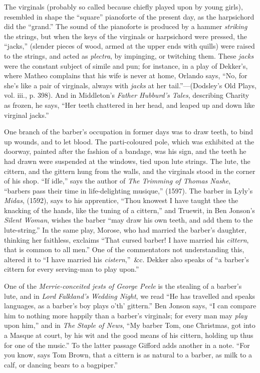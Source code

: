The virginals (probably so called because chiefly played upon by young girls),
resembled in shape the “square” pianoforte of the present day, as the harpsichord
did the “grand.” The sound of the pianoforte is produced by a hammer \textit{striking}
the strings, but when the keys of the virginals or harpsichord were pressed, the
“jacks,” (slender pieces of wood, armed \pagebreak at the upper ends with quills) were
raised to the strings, and acted as \textit{plectra}, by impinging, or twitching them.
These \textit{jacks} were the constant subject of simile and pun; for instance, in a play
of Dekker’s, where Matheo complains that his wife is never at home, Orlando says,
“No, for she’s like a pair of virginals, always with \textit{jacks} at her tail.”—(Dodsley’s
Old Plays, vol. iii., p. 398). And in Middleton’s \textit{Father Hubburd’s Tales}, describing
Charity as frozen, he says, “Her teeth chattered in her head, and leaped
up and down like virginal jacks.”

One branch of the barber’s occupation in former days was to draw teeth, to bind
up wounds, and to let blood. The parti-coloured pole, which was exhibited at the
doorway, painted after the fashion of a bandage, was his sign, and the teeth
he had drawn were suspended at the windows, tied upon lute strings. The lute,
the cittern, and the gittern hung from the walls, and the virginals stood in the
corner of his shop. “If idle,” says the author of \textit{The Trimming of Thomas
Nashe}, “barbers pass their time in life-delighting musique,” (1597). The
barber in Lyly’s \textit{Midas}, (1592), says to his apprentice, “Thou knowest I have
taught thee the knacking of the hands,
 like the tuning of a cittern,” and
Truewit, in Ben Jonson’s \textit{Silent Woman}, wishes the barber “may draw his own
teeth, and add them to the lute-string.” In the same play, Morose, who had
married the barber’s daughter, thinking her faithless, exclaims “That cursed
barber! I have married his \textit{cittern}, that is common to all men.” One of the
commentators not understanding this, altered it to “I have married his \textit{cistern},”~\&c. 
Dekker also speaks of “a barber’s cittern for every serving-man to play
upon.”

One of the \textit{Merrie-conceited jests of George Peele} is the stealing of a barber’s
lute, and in \textit{Lord Falkland’s Wedding Night}, we read “He has travelled
and speaks languages, as a barber’s boy plays o’th’ gittern.” Ben Jonson says,
“I can compare him to nothing more happily than a barber’s virginals; for every
man may \textit{play} upon him,” and in \textit{The Staple of News}, “My barber Tom, one
Christmas, got into a Masque at court, by his wit and the good means of his
cittern, holding up thus for one of the music.” To the latter passage Gifford adds
another in a note. “For you know, says Tom Brown, that a cittern is as natural
to a barber, as milk to a calf, or dancing bears to a bagpiper.”

